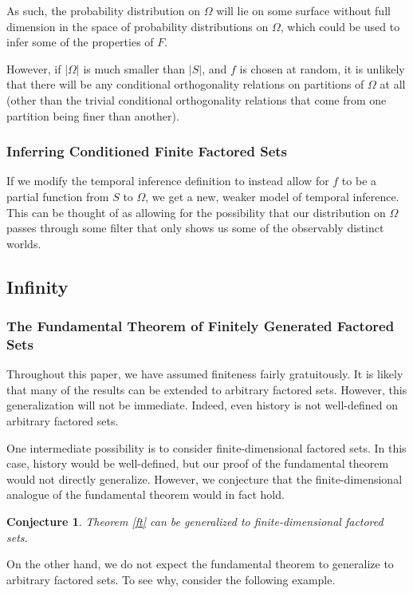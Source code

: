 \documentclass[authordate,onecolumn]{miri-tech-article}
\newtheorem{conjecture}{Conjecture}
\begin{document}
As such, the probability distribution on $\Omega$ will lie on some surface without full dimension in the space of probability distributions on $\Omega$, which could be used to infer some of the properties of $F$.

However, if $|\Omega|$ is much smaller than $|S|$, and $f$ is chosen at random, it is unlikely that there will be any conditional orthogonality relations on partitions of $\Omega$ at all (other than the trivial conditional orthogonality relations that come from one partition being finer than another).

\subsubsection{Inferring Conditioned Finite Factored Sets}

If we modify the temporal inference definition to instead allow for $f$ to be a partial function from $S$ to $\Omega$, we get a new, weaker model of temporal inference. This can be thought of as allowing for the possibility that our distribution on $\Omega$ passes through some filter that only shows us some of the observably distinct worlds.
\subsection{Infinity}
\subsubsection{The Fundamental Theorem of Finitely Generated Factored Sets}
Throughout this paper, we have assumed finiteness fairly gratuitously. It is likely that many of the results can be extended to arbitrary factored sets. However, this generalization will not be immediate. Indeed, even history is not well-defined on arbitrary factored sets.

One intermediate possibility is to consider finite-dimensional factored sets. In this case, history would be well-defined, but our proof of the fundamental theorem would not directly generalize. However, we conjecture that the finite-dimensional analogue of the fundamental theorem would in fact hold.

\begin{conjecture}
Theorem \ref{ft} can be generalized to finite-dimensional factored sets.
\end{conjecture}

On the other hand, we do not expect the fundamental theorem to generalize to arbitrary factored sets. To see why, consider the following example.
\end{document}
